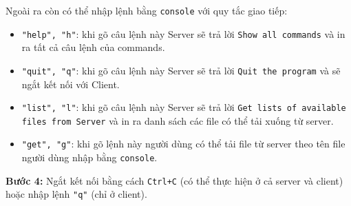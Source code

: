 \documentclass[a4paper,12pt]{report}
\begin{document}
\begin{description}
        Ngoài ra còn có thể nhập lệnh bằng \verb|console| với quy tắc giao tiếp:
        \begin{itemize}
          \item \verb|"help", "h"|: khi gõ câu lệnh này Server sẽ trả lời \texttt{Show all commands} và in ra tất cả câu lệnh của commands.
          \item \verb|"quit", "q"|:  khi gõ câu lệnh này Server sẽ trả lời \texttt{Quit the program} và sẽ ngắt kết nối với Client.
          \item \verb|"list", "l"|:  khi gõ câu lệnh này Server sẽ trả lời \texttt{Get lists of available files from Server} và in ra danh sách các file có thể tải xuống từ server.
          \item \verb|"get", "g"|:  khi gõ lệnh này người dùng có thể tải file từ server theo tên file người dùng nhập bằng \verb|console|.
        \end{itemize}
  \item \textbf{Bước 4:} Ngắt kết nối bằng cách \verb|Ctrl+C| (có thể thực hiện ở cả server và client) hoặc nhập lệnh \verb|"q"| (chỉ ở client).
\end{description}

\pagebreak
\end{document}
